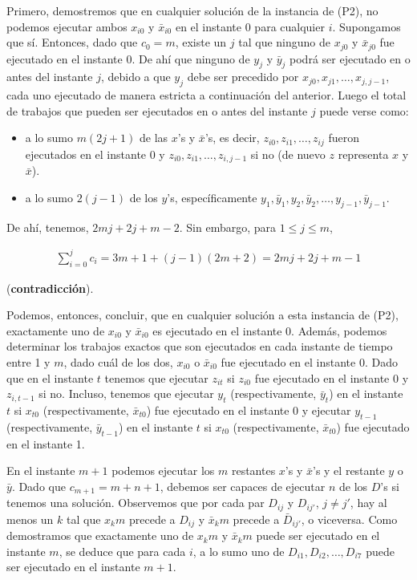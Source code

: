 \documentclass[14pt]{extarticle}
\begin{document}
Primero, demostremos que en cualquier solución de la instancia de (P2), no podemos ejecutar ambos $x_{i0}$ y $\bar x_{i0}$ en el instante 0 para cualquier $i$. Supongamos que sí. Entonces, dado que $c_0 = m$, existe un $j$ tal que ninguno de $x_{j0}$ y $\bar x_{j0}$ fue ejecutado en el instante 0. De ahí que ninguno de $y_j$ y $\bar y_j$ podrá ser ejecutado en o antes del instante $j$, debido a que $y_j$ debe ser precedido por $x_{j0}, x_{j1}, \ldots, x_{j, j-1}$, cada uno ejecutado de manera estricta a continuación del anterior. Luego el total de trabajos que pueden ser ejecutados en o antes del instante $j$ puede verse como:

\begin{itemize}
    \item a lo sumo $m(2j + 1)$ de las $x$'s y $\bar x$'s, es decir, $z_{i0}, z_{i1}, \ldots, z_{ij}$ fueron ejecutados en el instante 0 y $z_{i0}, z_{i1}, \ldots, z_{i, j-1}$ si no (de nuevo $z$ representa $x$ y $\bar x$).
    \item a lo sumo $2(j - 1)$ de los $y$'s, específicamente $y_1, \bar y_1, y_2, \bar y_2, \ldots, y_{j - 1}, \bar y_{j - 1}$.
\end{itemize}

De ahí, tenemos, $2mj + 2j + m - 2$. Sin embargo, para $1 \leq j \leq m$,

\begin{align*}
\sum_{i=0}^{j} c_i = 3m + 1 + (j - 1)(2m + 2) = 2mj + 2j + m - 1
\end{align*}

(\textbf{contradicción}).

Podemos, entonces, concluir, que en cualquier solución a esta instancia de (P2), exactamente uno de $x_{i0}$ y $\bar x_{i0}$ es ejecutado en el instante 0. Además, podemos determinar los trabajos exactos que son ejecutados en cada instante de tiempo entre 1 y $m$, dado cuál de los dos, $x_{i0}$ o $\bar x_{i0}$ fue ejecutado en el instante 0. Dado que en el instante $t$ tenemos que ejecutar $z_{it}$ si $z_{i0}$ fue ejecutado en el instante 0 y $z_{i, t-1}$ si no. Incluso, tenemos que ejecutar $y_t$ (respectivamente, $\bar y_t$) en el instante $t$ si $x_{t0}$ (respectivamente, $\bar x_{t0}$) fue ejecutado en el instante 0 y ejecutar $y_{t - 1}$ (respectivamente, $\bar y_{t - 1}$) en el instante $t$ si $x_{t0}$ (respectivamente, $\bar x_{t0}$) fue ejecutado en el instante 1.

En el instante $m + 1$ podemos ejecutar los $m$ restantes $x$'s y $\bar x$'s y el restante $y$ o $\bar y$. Dado que $c_{m+1} = m + n + 1$, debemos ser capaces de ejecutar $n$ de los $D$'s si tenemos una solución. Observemos que por cada par $D_{ij}$ y  $D_{ij'}$, $j \neq j'$, hay al menos un $k$ tal que $x_km$ precede a $D_{ij}$ y $\bar x_km$ precede a $\bar D_{ij'}$, o viceversa. Como demostramos que exactamente uno de $x_km$ y $\bar x_km$ puede ser ejecutado en el instante $m$, se deduce que para cada $i$, a lo sumo uno de $D_{i1}, D_{i2}, \ldots, D_{i7}$ puede ser ejecutado en el instante $m + 1$.
\end{document}
